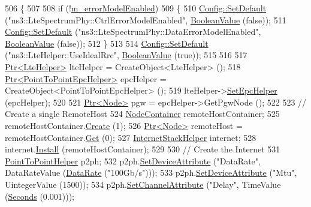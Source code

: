 \begin{DoxyCode}
506 \{
507 
508   \textcolor{keywordflow}{if} (!\hyperlink{classLenaTdTbfqFfMacSchedulerTestCase2_a5190f2d6a5b2d86db77abeca1d31c58a}{m\_errorModelEnabled})
509     \{
510       \hyperlink{group__config_ga2e7882df849d8ba4aaad31c934c40c06}{Config::SetDefault} (\textcolor{stringliteral}{"ns3::LteSpectrumPhy::CtrlErrorModelEnabled"}, 
      \hyperlink{classns3_1_1BooleanValue}{BooleanValue} (\textcolor{keyword}{false}));
511       \hyperlink{group__config_ga2e7882df849d8ba4aaad31c934c40c06}{Config::SetDefault} (\textcolor{stringliteral}{"ns3::LteSpectrumPhy::DataErrorModelEnabled"}, 
      \hyperlink{classns3_1_1BooleanValue}{BooleanValue} (\textcolor{keyword}{false}));
512     \}
513 
514   \hyperlink{group__config_ga2e7882df849d8ba4aaad31c934c40c06}{Config::SetDefault} (\textcolor{stringliteral}{"ns3::LteHelper::UseIdealRrc"}, 
      \hyperlink{classns3_1_1BooleanValue}{BooleanValue} (\textcolor{keyword}{true}));
515 
516 
517   \hyperlink{classns3_1_1Ptr}{Ptr<LteHelper>} lteHelper = CreateObject<LteHelper> ();
518   \hyperlink{classns3_1_1Ptr}{Ptr<PointToPointEpcHelper>}  epcHelper = CreateObject<PointToPointEpcHelper> ();
519   lteHelper->\hyperlink{classns3_1_1LteHelper_a324079a1ccd54ce949786b83d6b95915}{SetEpcHelper} (epcHelper);
520 
521   \hyperlink{classns3_1_1Ptr}{Ptr<Node>} pgw = epcHelper->GetPgwNode ();
522 
523   \textcolor{comment}{// Create a single RemoteHost}
524   \hyperlink{classns3_1_1NodeContainer}{NodeContainer} remoteHostContainer;
525   remoteHostContainer.\hyperlink{classns3_1_1NodeContainer_a787f059e2813e8b951cc6914d11dfe69}{Create} (1);
526   \hyperlink{classns3_1_1Ptr}{Ptr<Node>} remoteHost = remoteHostContainer.\hyperlink{classns3_1_1NodeContainer_a9ed96e2ecc22e0f5a3d4842eb9bf90bf}{Get} (0);
527   \hyperlink{classns3_1_1InternetStackHelper}{InternetStackHelper} internet;
528   internet.\hyperlink{classns3_1_1InternetStackHelper_a6645b412f31283d2d9bc3d8a95cebbc0}{Install} (remoteHostContainer);
529 
530   \textcolor{comment}{// Create the Internet}
531   \hyperlink{classns3_1_1PointToPointHelper}{PointToPointHelper} p2ph;
532   p2ph.\hyperlink{classns3_1_1PointToPointHelper_a4577f5ab8c387e5528af2e0fbab1152e}{SetDeviceAttribute} (\textcolor{stringliteral}{"DataRate"}, DataRateValue (\hyperlink{classns3_1_1DataRate}{DataRate} (\textcolor{stringliteral}{"100Gb/s"})));
533   p2ph.\hyperlink{classns3_1_1PointToPointHelper_a4577f5ab8c387e5528af2e0fbab1152e}{SetDeviceAttribute} (\textcolor{stringliteral}{"Mtu"}, UintegerValue (1500));
534   p2ph.\hyperlink{classns3_1_1PointToPointHelper_a6b5317fd17fb61e5a53f8d66a90b63b9}{SetChannelAttribute} (\textcolor{stringliteral}{"Delay"}, TimeValue (\hyperlink{group__timecivil_ga33c34b816f8ff6628e33d5c8e9713b9e}{Seconds} (0.001)));

\end{DoxyCode}
